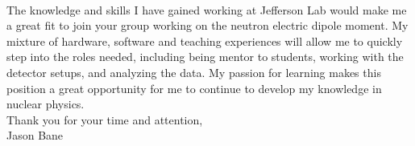 \documentclass[12pt,letterpaper]{article}
\begin{document}
\paragraph{}The knowledge and skills I have gained working at Jefferson Lab would make me a great fit to join your group working on the neutron electric dipole moment. My mixture of hardware, software and teaching experiences will allow me to quickly step into the roles needed, including being mentor to students, working with the detector setups, and analyzing the data. My passion for learning makes this position a great opportunity for me to continue to develop my knowledge in nuclear physics.      
\\

\noindent Thank you for your time and attention,\\
\noindent Jason Bane
\end{document}

